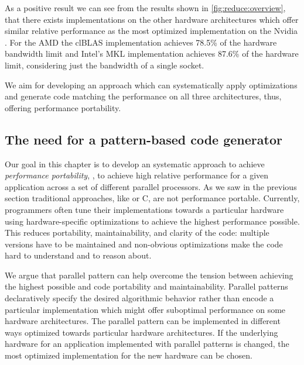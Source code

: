 As a positive result we can see from the results shown in \autoref{fig:reduce:overview}, that there exists implementations on the other hardware architectures which offer similar relative performance as the most optimized implementation on the Nvidia \GPU.
For the AMD \GPU the clBLAS implementation achieves 78.5\% of the hardware bandwidth limit and Intel's MKL implementation achieves 87.6\% of the hardware limit, considering just the bandwidth of a single \CPU socket.

We aim for developing an approach which can systematically apply optimizations and generate code matching the performance on all three architectures, thus, offering performance portability.


\subsection{The need for a pattern-based code generator}

Our goal in this chapter is to develop an systematic approach to achieve \emph{performance portability}, \ie, to achieve high relative performance for a given application across a set of different parallel processors.
As we saw in the previous section traditional approaches, like \OpenCL or C, are not performance portable.
Currently, programmers often tune their implementations towards a particular hardware using hardware-specific optimizations to achieve the highest performance possible.
This reduces portability, maintainability, and clarity of the code:
multiple versions have to be maintained and non-obvious optimizations make the code hard to understand and to reason about.

We argue that parallel pattern can help overcome the tension between achieving the highest possible and code portability and maintainability.
Parallel patterns declaratively specify the desired algorithmic behavior rather than encode a particular implementation which might offer suboptimal performance on some hardware architectures.
The parallel pattern can be implemented in different ways optimized towards particular hardware architectures.
If the underlying hardware for an application implemented with parallel patterns is changed, the most optimized implementation for the new hardware can be chosen.

